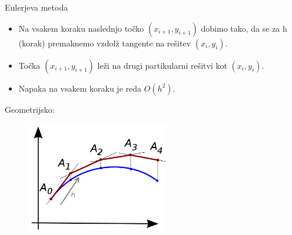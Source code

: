 \documentclass{beamer}
\begin{document}
	\begin{frame}{Eulerjeva metoda}
		\begin{itemize}
			\item Na vsakem koraku naslednjo točko $(x_{i+1},y_{i+1})$ dobimo tako, da se za h (korak) premaknemo vzdolž tangente na rešitev $(x_{i},y_{i})$. 
			\item Točka $(x_{i+1},y_{i+1})$ leži na drugi partikularni rešitvi kot $(x_{i},y_{i})$.
			\item Napaka na vsakem koraku je reda $O(h^2)$.
		\end{itemize}
		\begin{block}{Geometrijsko:}
			\begin{figure}
				\centering
				\includegraphics[width=0.55\textwidth]{Euler_method_geom}
			\end{figure}
		\end{block}
	\end{frame}
	
\end{document}
